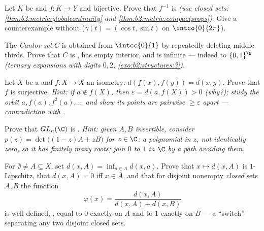 \begin{exercise}[$\star\star$]\label{exo:b2:metric:7}
Let $K$ be  and $f \colon K \to Y$  and bijective.
Prove that $f^{-1}$ is  \emph{(use closed sets:
\cref{thm:b2:metric:globalcontinuity} and
\cref{thm:b2:metric:compactprops})}. Give a counterexample without
 ($\gamma(t) = (\cos t, \sin t)$ on
$\intco{0}{2\pi}$).
\end{exercise}

\begin{exercise}[$\star\star$]\label{exo:b2:metric:8}
The \emph{Cantor set} $C$ is obtained from $\intcc{0}{1}$ by
repeatedly deleting  middle thirds. Prove that $C$ is ,
has empty interior, and is infinite --- indeed  to
$\{0,1\}^{\N}$ \emph{(ternary expansions with digits $0,2$;
\cref{exo:b2:structures:3})}.
\end{exercise}

\begin{exercise}[$\star\star\star$]\label{exo:b2:metric:9}
Let $X$ be a \emph{}  and $f \colon X \to X$ an
isometry: $d(f(x), f(y)) = d(x, y)$. Prove that $f$ is surjective.
\emph{Hint: if $a \notin f(X)$, then $\varepsilon = d(a, f(X)) > 0$
(why?); study the orbit $a, f(a), f^2(a), \dots$ and show its
points are pairwise $\geq \varepsilon$ apart --- contradiction with
.}
\end{exercise}

\begin{exercise}[$\star\star\star$]\label{exo:b2:metric:10}
Prove that $GL_n(\C)$ is . \emph{Hint: given $A, B$
invertible, consider $p(z) = \det\bigl((1 - z)A + zB\bigr)$ for $z
\in \C$: a polynomial in $z$, not identically zero, so it has
finitely many roots; join $0$ to $1$ in $\C$ by a path avoiding
them.}
\end{exercise}

\begin{exercise}[$\star\star$]\label{exo:b2:metric:11}
For $\emptyset \neq A \subseteq X$, set $d(x, A) = \inf_{a \in A}
d(x, a)$. Prove that $x \mapsto d(x, A)$ is $1$-Lipschitz, that
$d(x, A) = 0$ iff $x \in \overline A$, and that for disjoint
nonempty \emph{closed} sets $A, B$ the function
\[
\varphi(x) = \frac{d(x, A)}{d(x, A) + d(x, B)}
\]
is well defined, , equal to $0$ exactly on $A$ and to
$1$ exactly on $B$ --- a  ``switch'' separating any two
disjoint closed sets.
\end{exercise}

